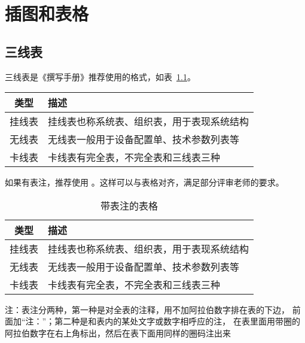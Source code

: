 
\chapter{插图和表格}

\section{三线表}

三线表是《撰写手册》推荐使用的格式，如表~\ref{tab:exampletable}。

\begin{table}
  \centering
  \label{tab:exampletable}
  \begin{tabular}{cl}
    \toprule
    类型   & 描述                                       \\
    \midrule
    挂线表 & 挂线表也称系统表、组织表，用于表现系统结构 \\
    无线表 & 无线表一般用于设备配置单、技术参数列表等   \\
    卡线表 & 卡线表有完全表，不完全表和三线表三种       \\
    \bottomrule
  \end{tabular}
\end{table}

如果有表注，推荐使用 。这样可以与表格对齐，满足部分评审老师的要求。

\begin{table}
  \centering
  \begin{threeparttable}
    \caption{带表注的表格}
    \label{tab:tablewithnotes}
    \begin{tabular}{cl}
      \toprule
      类型   & 描述                                       \\
      \midrule
      挂线表 & 挂线表也称系统表、组织表，用于表现系统结构 \\
      无线表 & 无线表一般用于设备配置单、技术参数列表等   \\
      卡线表 & 卡线表有完全表，不完全表和三线表三种       \\
      \bottomrule
    \end{tabular}
    \begin{tablenotes}[flushleft]
      \item 注：表注分两种，第一种是对全表的注释，用不加阿拉伯数字排在表的下边，
      前面加“注：”；第二种是和表内的某处文字或数字相呼应的注，
      在表里面用带圈的阿拉伯数字在右上角标出，然后在表下面用同样的圈码注出来
    \end{tablenotes}
  \end{threeparttable}
\end{table}

